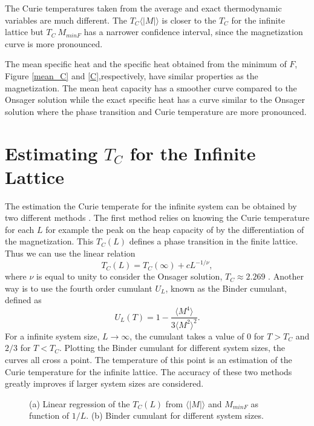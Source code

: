 	The Curie temperatures taken from the average and exact thermodynamic variables are much different. The $T_C \langle |M| \rangle$ is closer to the $T_C$ for the infinite lattice but $T_C\ M_{minF}$ has a narrower confidence interval, since the magnetization curve is more pronounced.
	
	The mean specific heat and the specific heat obtained from the minimum of $F$, Figure \ref{mean_C} and \ref{C},respectively, have similar properties as the magnetization. The mean heat capacity has a smoother curve compared to the Onsager solution while the exact specific heat has a curve similar to the Onsager solution where the phase transition and Curie temperature are more pronounced.

\pagebreak

\section{Estimating $T_C$ for the Infinite Lattice}

	The estimation the Curie temperate for the infinite system can be obtained by two different methods \cite{Landau_Book}. The first method relies on knowing the Curie temperature for each $L$ for example the peak on the heap capacity of by the differentiation of the magnetization. This $T_C(L)$ defines a phase transition in the finite lattice. Thus we can use the linear relation
\begin{equation}\label{TC_reg_exp}
	T_C(L) = T_C(\infty) + cL^{-1/\nu},
\end{equation}
where $\nu$ is equal to unity to consider the Onsager solution, $T_C\approx2.269$ \cite{Onsager1944}.
Another way is to use the fourth order cumulant $U_L$, known as the Binder cumulant, defined as
\begin{equation}
	U_L(T) = 1 - \frac{\langle M^4 \rangle}{3\langle M^2 \rangle^2}.
\end{equation}
For a infinite system size, $L\rightarrow\infty$, the cumulant takes a value of 0 for $T>T_C$ and $2/3$ for $T<T_C$.
Plotting the Binder cumulant for different system sizes, the curves all cross a point. The temperature of this point is an estimation of the Curie temperature for the infinite lattice. The accuracy of these two methods greatly improves if larger system sizes are considered.

\begin{figure}[h]
	\centering
	\caption{(a) Linear regression of the $T_C(L)$ from $\langle |M| \rangle$ and $M_{minF}$ as function of $1/L$. (b) Binder cumulant for different system sizes.}
	\label{TC_inf}
\end{figure}

